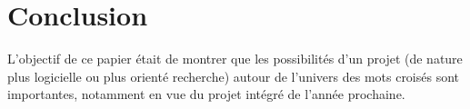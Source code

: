 \documentclass{article}
\begin{document}
\section{Conclusion}

L'objectif de ce papier était de montrer que les possibilités d'un projet (de nature plus logicielle ou plus orienté recherche) autour de l'univers des mots croisés sont importantes, notamment en vue du projet intégré de l'année prochaine.



\end{document}
